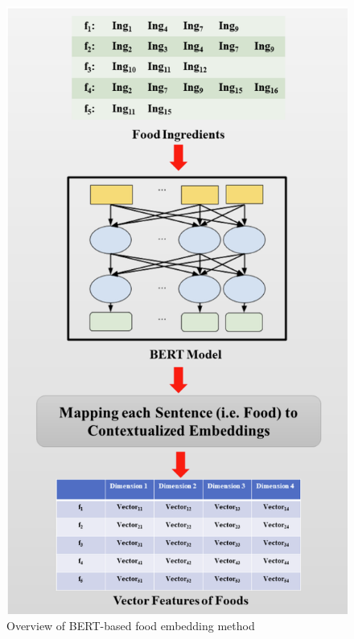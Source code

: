 \begin{figure}[htp]
    \centering
    \includegraphics[scale=0.80]{overview_of_bert_based_food_embedding_method.png}
    \caption{Overview of BERT-based food embedding method}
    \label{fig:BERT-based food embedding}
\end{figure}


